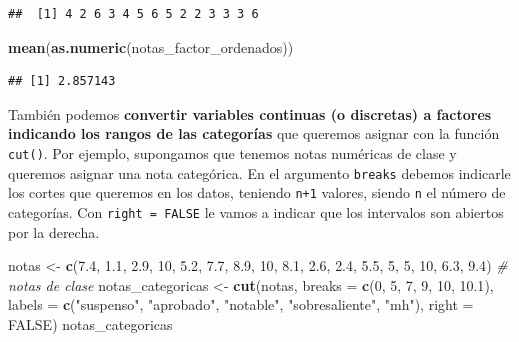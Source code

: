 \documentclass[11pt,]{book}
\newenvironment{Shaded}{\begin{snugshade}}{\end{snugshade}}
\newcommand{\CommentTok}[1]{\textcolor[rgb]{0.37,0.37,0.37}{\textit{#1}}}
\newcommand{\DataTypeTok}[1]{\textcolor[rgb]{0.27,0.27,0.27}{#1}}
\newcommand{\DecValTok}[1]{\textcolor[rgb]{0.06,0.06,0.06}{#1}}
\newcommand{\FloatTok}[1]{\textcolor[rgb]{0.06,0.06,0.06}{#1}}
\newcommand{\KeywordTok}[1]{\textcolor[rgb]{0.27,0.27,0.27}{\textbf{#1}}}
\newcommand{\NormalTok}[1]{#1}
\newcommand{\OtherTok}[1]{\textcolor[rgb]{0.37,0.37,0.37}{#1}}
\newcommand{\StringTok}[1]{\textcolor[rgb]{0.5,0.5,0.5}{#1}}
\begin{document}
\begin{verbatim}
##  [1] 4 2 6 3 4 5 6 5 2 2 3 3 3 6
\end{verbatim}

\begin{Shaded}
\begin{Highlighting}[]
\KeywordTok{mean}\NormalTok{(}\KeywordTok{as.numeric}\NormalTok{(notas_factor_ordenados))}
\end{Highlighting}
\end{Shaded}

\begin{verbatim}
## [1] 2.857143
\end{verbatim}

También podemos \textbf{convertir variables continuas (o discretas) a factores indicando los rangos de las categorías} que queremos asignar con la función \texttt{cut()}. Por ejemplo, supongamos que tenemos notas numéricas de clase y queremos asignar una nota categórica. En el argumento \texttt{breaks} debemos indicarle los cortes que queremos en los datos, teniendo \texttt{n+1} valores, siendo \texttt{n} el número de categorías. Con \texttt{right\ =\ FALSE} le vamos a indicar que los intervalos son abiertos por la derecha.

\begin{Shaded}
\begin{Highlighting}[]
\NormalTok{notas <-}\StringTok{ }\KeywordTok{c}\NormalTok{(}\FloatTok{7.4}\NormalTok{, }\FloatTok{1.1}\NormalTok{, }\FloatTok{2.9}\NormalTok{, }\DecValTok{10}\NormalTok{, }\FloatTok{5.2}\NormalTok{, }\FloatTok{7.7}\NormalTok{, }\FloatTok{8.9}\NormalTok{, }\DecValTok{10}\NormalTok{, }\FloatTok{8.1}\NormalTok{, }\FloatTok{2.6}\NormalTok{, }\FloatTok{2.4}\NormalTok{, }\FloatTok{5.5}\NormalTok{, }\DecValTok{5}\NormalTok{, }\DecValTok{5}\NormalTok{, }\DecValTok{10}\NormalTok{, }\FloatTok{6.3}\NormalTok{, }\FloatTok{9.4}\NormalTok{) }\CommentTok{# notas de clase}
\NormalTok{notas_categoricas <-}\StringTok{ }\KeywordTok{cut}\NormalTok{(notas, }\DataTypeTok{breaks =} \KeywordTok{c}\NormalTok{(}\DecValTok{0}\NormalTok{, }\DecValTok{5}\NormalTok{, }\DecValTok{7}\NormalTok{, }\DecValTok{9}\NormalTok{, }\DecValTok{10}\NormalTok{, }\FloatTok{10.1}\NormalTok{), }\DataTypeTok{labels =} \KeywordTok{c}\NormalTok{(}\StringTok{"suspenso"}\NormalTok{, }\StringTok{"aprobado"}\NormalTok{, }\StringTok{"notable"}\NormalTok{, }\StringTok{"sobresaliente"}\NormalTok{, }\StringTok{"mh"}\NormalTok{), }\DataTypeTok{right =} \OtherTok{FALSE}\NormalTok{)}
\NormalTok{notas_categoricas}
\end{Highlighting}
\end{Shaded}
\end{document}
